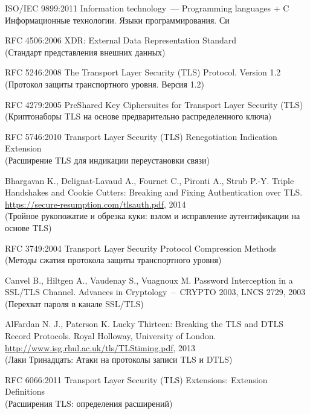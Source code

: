 \begin{thebibliography}{999}

ISO/IEC 9899:2011 
Information technology~--– Programming languages + C\\
{\small Информационные технологии. Языки программирования. Си}

RFC 4506:2006 XDR: 
External Data Representation Standard \\
{\small (Стандарт представления внешних данных)}

RFC 5246:2008 
The Transport Layer Security (TLS) Protocol. Version 1.2 \\
{\small (Протокол защиты транспортного уровня. Версия 1.2)}

RFC 4279:2005 
PreShared Key Ciphersuites for Transport Layer Security (TLS)\\ 
{\small (Криптонаборы TLS на основе предварительно распределенного ключа)}

RFC 5746:2010 
Transport Layer Security (TLS) Renegotiation Indication Extension\\ 
{\small (Расширение TLS для индикации переустановки связи)}

Bhargavan K., Delignat-Lavaud A., Fournet C., Pironti A., Strub P.-Y. 
Triple Handshakes and Cookie Cutters: Breaking and Fixing Authentication over TLS. 
\url{https://secure-resumption.com/tlsauth.pdf}, 2014\\ 
{\small (Тройное рукопожатие и обрезка куки: взлом и исправление аутентификации 
на основе TLS)}

RFC 3749:2004 
Transport Layer Security Protocol Compression Methods\\ 
{\small (Методы сжатия протокола защиты транспортного уровня)}

Canvel B., Hiltgen A., Vaudenay S., Vuagnoux M. 
Password Interception in a SSL/TLS Channel. Advances in 
Cryptology~--~CRYPTO 2003, LNCS 2729, 2003 \\  
{\small (Перехват пароля в канале SSL/TLS)}

AlFardan N. J., Paterson K. Lucky Thirteen: 
Breaking the TLS and DTLS Record Protocols. 
Royal Holloway, University of London. 
\url{http://www.isg.rhul.ac.uk/tls/TLStiming.pdf}, 2013\\  
{\small (Лаки Тринадцать: Атаки на протоколы записи TLS и DTLS)}

RFC 6066:2011 
Transport Layer Security (TLS) Extensions: Extension Definitions\\
{\small (Расширения TLS: определения расширений)}


\end{thebibliography}
